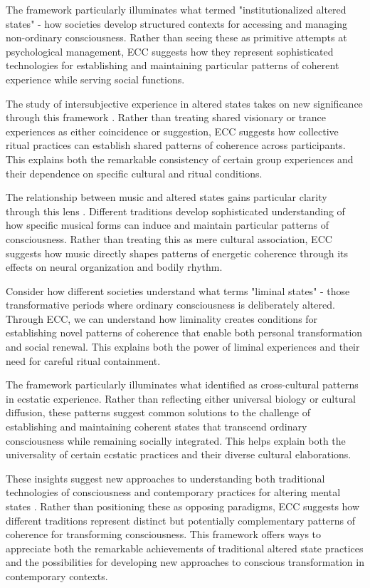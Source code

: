 The framework particularly illuminates what \cite{bourguignon1976possession} termed "institutionalized altered states" - how societies develop structured contexts for accessing and managing non-ordinary consciousness. Rather than seeing these as primitive attempts at psychological management, ECC suggests how they represent sophisticated technologies for establishing and maintaining particular patterns of coherent experience while serving social functions.

The study of intersubjective experience in altered states takes on new significance through this framework \cite{rouget1985music}. Rather than treating shared visionary or trance experiences as either coincidence or suggestion, ECC suggests how collective ritual practices can establish shared patterns of coherence across participants. This explains both the remarkable consistency of certain group experiences and their dependence on specific cultural and ritual conditions.

The relationship between music and altered states gains particular clarity through this lens \cite{rouget1985music}. Different traditions develop sophisticated understanding of how specific musical forms can induce and maintain particular patterns of consciousness. Rather than treating this as mere cultural association, ECC suggests how music directly shapes patterns of energetic coherence through its effects on neural organization and bodily rhythm.

Consider how different societies understand what \cite{turner1969ritual} terms "liminal states" - those transformative periods where ordinary consciousness is deliberately altered. Through ECC, we can understand how liminality creates conditions for establishing novel patterns of coherence that enable both personal transformation and social renewal. This explains both the power of liminal experiences and their need for careful ritual containment.

The framework particularly illuminates what \cite{goodman1988ecstasy} identified as cross-cultural patterns in ecstatic experience. Rather than reflecting either universal biology or cultural diffusion, these patterns suggest common solutions to the challenge of establishing and maintaining coherent states that transcend ordinary consciousness while remaining socially integrated. This helps explain both the universality of certain ecstatic practices and their diverse cultural elaborations.

These insights suggest new approaches to understanding both traditional technologies of consciousness and contemporary practices for altering mental states \cite{winkelman2010shamanism}. Rather than positioning these as opposing paradigms, ECC suggests how different traditions represent distinct but potentially complementary patterns of coherence for transforming consciousness. This framework offers ways to appreciate both the remarkable achievements of traditional altered state practices and the possibilities for developing new approaches to conscious transformation in contemporary contexts.

